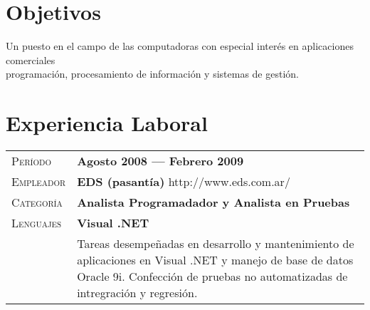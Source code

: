 \documentclass[a4paper, oneside, final]{scrartcl} %
\newcommand{\gray}{\rowcolor[gray]{.90}} %
\begin{document}
\begin{center} %


{\fontsize{36}{36}\selectfont\scshape{}} %

\vspace{1.5cm} %


\section{Objetivos}

Un puesto en el campo de las computadoras con especial interés en aplicaciones comerciales \\ programación, procesamiento de información y sistemas de gestión.


\section{Experiencia Laboral}

\begin{tabularx}{0.97\linewidth}{>{\raggedleft\scshape}p{2cm}X}
\gray Período   & \textbf{Agosto 2008 --- Febrero 2009}\\
\gray Empleador & \textbf{EDS (pasantía)} \hfill http://www.eds.com.ar/\\
\gray Categoría & \textbf{Analista Programadador y Analista en Pruebas}\\
\gray Lenguajes & \textbf{Visual .NET}\\
       & Tareas desempeñadas en desarrollo y mantenimiento de aplicaciones en Visual .NET y manejo de base de datos Oracle 9i. Confección de pruebas no automatizadas de intregración y regresión.
\end{tabularx}


\end{center}
\end{document}
